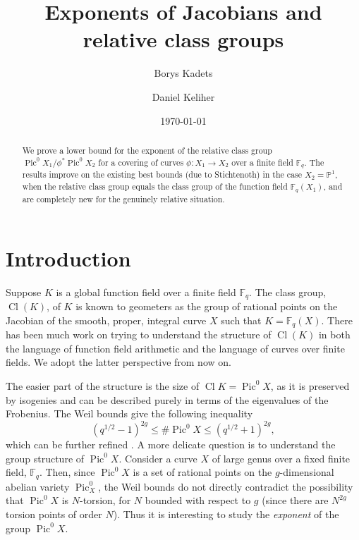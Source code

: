 \documentclass[11pt]{amsart}
\title[Exponents of Jacobians and relative class groups]{Exponents of Jacobians and relative class groups}
\author{Borys Kadets}
\author{Daniel Keliher}
\date{\today}
\newcommand{\F}{\mathbb{F}}
\newcommand{\PP}{\mathbb{P}}
\DeclareMathOperator{\Cl}{Cl}
\DeclareMathOperator{\Pic}{Pic}
\theoremstyle{definition}
\theoremstyle{remark}
\begin{document}
\begin{abstract}
   We prove a lower bound for the exponent of the relative class group $\Pic^0 X_1/\phi^* \Pic^0 X_2$ for a covering of curves $\phi\colon X_1 \to X_2$ over a finite field $\F_q$. The results improve on the existing best bounds (due to Stichtenoth) in the case $X_2=\PP^1$, when the relative class group equals the class group of the function field $\F_q(X_1)$, and are completely new for the genuinely relative situation.
\end{abstract}

 

\maketitle
\section{Introduction}

Suppose $K$ is a global function field over a finite field $\F_q$. The class group, $\Cl(K)$, of $K$ is known to geometers as the group of rational points on the Jacobian of the smooth, proper, integral curve $X$ such that $K=\F_q(X)$. There has been much work on trying to understand the structure of $\Cl(K)$ in both the language of function field arithmetic and the language of curves over finite fields. We adopt the latter perspective from now on.

The easier part of the structure is the size of $\Cl K = \Pic^0 X$, as it is preserved by isogenies and can be described purely in terms of the eigenvalues of the Frobenius. The Weil bounds give the following inequality
\[\left(q^{1/2}-1\right)^{2g} \leqslant \# \Pic^0X \leqslant \left(q^{1/2}+1\right)^{2g},\]
which can be further refined   \cite{lebacque2014number}. A more delicate question is to understand the group structure of $\Pic^0 X$. Consider a curve $X$ of large genus over a fixed finite field, $\F_q$. Then, since $\Pic^0 X$ is a set of rational points on the $g$-dimensional abelian variety $\Pic_X^0$, the Weil bounds do not directly contradict the possibility that $\Pic^0 X$ is $N$-torsion, for $N$ bounded with respect to $g$ (since there are $N^{2g}$ torsion points of order $N$). Thus it is interesting to study the \emph{exponent} of the group $\Pic^0 X$.
\end{document}
